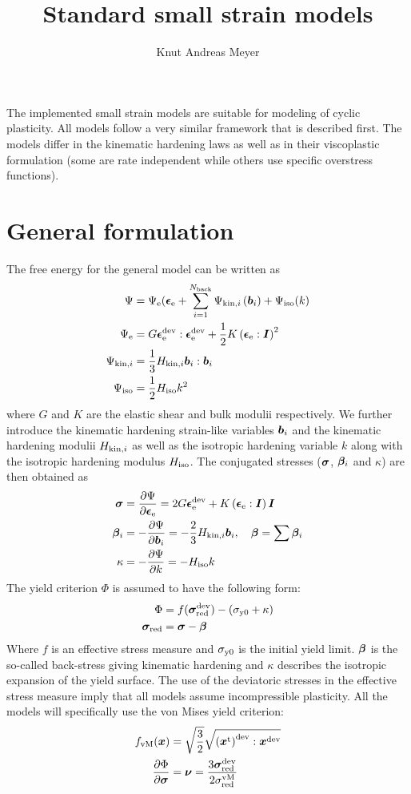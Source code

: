 \documentclass[10pt,a4paper]{article}
\title{Standard small strain models}
\author{Knut Andreas Meyer}
\begin{document}
\maketitle

The implemented small strain models are suitable for modeling of cyclic plasticity. All models follow a very similar framework that is described first. The models differ in the kinematic hardening laws as well as in their viscoplastic formulation (some are rate independent while others use specific overstress functions). 
\section{General formulation}
The free energy for the general model can be written as
\begin{align}
\Psi &= \Psi\el(\ts{\epsilon}\el + \sum_{i=1}^{N\subscr{back}} \Psi\kini\left(\ts{b}\inds{i}\right) + \Psi\iso(k) \\
\Psi\el &= G\ts{\epsilon}\el\dev:\ts{\epsilon}\el\dev + 
		   \frac{1}{2} K \left(\ts{\epsilon}\el:\ts{I}\right)^2	\\
\Psi\kini &= \frac{1}{3} H\kini\ts{b}\inds{i}:\ts{b}\inds{i} \\
\Psi\iso &= \frac{1}{2} H\iso k^2
\end{align}
where $G$ and $K$ are the elastic shear and bulk modulii respectively. We further introduce the kinematic hardening strain-like variables $\ts{b}\inds{i}$ and the kinematic hardening modulii $H\kini$ as well as the isotropic hardening variable $k$ along with the isotropic hardening modulus $H\iso$. The conjugated stresses ($\ts{\sigma}$, $\ts{\beta}\inds{i}$ and $\kappa$) are then obtained as
\begin{align}
\ts{\sigma} &= \pdiff[\Psi]{\ts{\epsilon}\el} = 2G\ts{\epsilon}\el\dev + K\left(\ts{\epsilon}\el:\ts{I}\right)\ts{I} \\
\ts{\beta}\inds{i} &= -\pdiff[\Psi]{\ts{b}\inds{i}} = - \frac{2}{3}H\kini\ts{b}\inds{i}, \quad \ts{\beta} = \sum \ts{\beta}\inds{i} \\
\kappa &= -\pdiff[\Psi]{k} = - H\iso k
\end{align}
The yield criterion $\Phi$ is assumed to have the following form:
\begin{align}
\Phi &= f(\ts{\sigma}\red\dev) - (\sigma\subscr{y0} + \kappa)\\
\ts{\sigma}\red &= \ts{\sigma} - \ts{\beta}
\end{align}
Where $f$ is an effective stress measure and $\sigma\subscr{y0}$ is the initial yield limit. $\ts{\beta}$ is the so-called back-stress giving kinematic hardening and $\kappa$ describes the isotropic expansion of the yield surface. The use of the deviatoric stresses in the effective stress measure imply that all models assume incompressible plasticity. All the models will specifically use the von Mises yield criterion:
\begin{align}
f\subscr{vM}(\ts{x}) &= \sqrt{\frac{3}{2}}\sqrt{\left(\tst{x}\right)\dev:\ts{x}\dev}\\
\pdiff[\Phi]{\ts{\sigma}} &= \ts{\nu} = \frac{3\ts{\sigma}\red\dev}{2\sigma\supscr{vM}\red}
\end{align}
\end{document}
